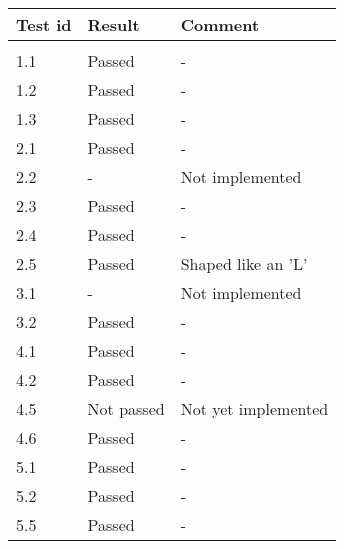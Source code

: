 \documentclass[a4paper,titlepage]{article}
\begin{document}
\begin{tabularx}{\textwidth}{XXX}
	Test id & Result    & Comment\\
\hline\\
	1.1     & Passed      & -\\
	1.2     & Passed      & -\\
	1.3     & Passed      & -\newline\\
	2.1     & Passed      & -\\
	2.2     & -           & Not implemented\\
	2.3     & Passed      & -\\
	2.4     & Passed      & -\\
	2.5     & Passed      & Shaped like an 'L'\newline\\
	3.1     & -           & Not implemented\\
	3.2     & Passed      & -\newline\\
	4.1     & Passed      & -\\
	4.2     & Passed      & -\\
	4.5     & Not passed  & Not yet implemented\\
	4.6     & Passed      & -\newline\\
	5.1     & Passed      & -\\
	5.2     & Passed      & -\\
	5.5     & Passed      & -\\
\end{tabularx}
\end{document}
